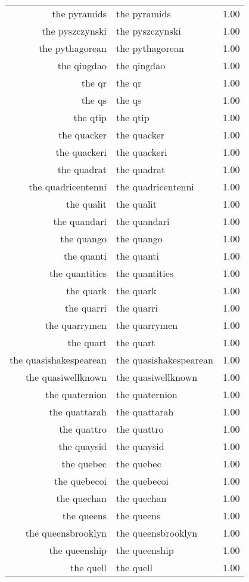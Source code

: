 \begin{table}[ht]
\begin{tabular}{rlr}
  the pyramids & the pyramids & 1.00 \\ 
  the pyszczynski & the pyszczynski & 1.00 \\ 
  the pythagorean & the pythagorean & 1.00 \\ 
  the qingdao & the qingdao & 1.00 \\ 
  the qr & the qr & 1.00 \\ 
  the qs & the qs & 1.00 \\ 
  the qtip & the qtip & 1.00 \\ 
  the quacker & the quacker & 1.00 \\ 
  the quackeri & the quackeri & 1.00 \\ 
  the quadrat & the quadrat & 1.00 \\ 
  the quadricentenni & the quadricentenni & 1.00 \\ 
  the qualit & the qualit & 1.00 \\ 
  the quandari & the quandari & 1.00 \\ 
  the quango & the quango & 1.00 \\ 
  the quanti & the quanti & 1.00 \\ 
  the quantities & the quantities & 1.00 \\ 
  the quark & the quark & 1.00 \\ 
  the quarri & the quarri & 1.00 \\ 
  the quarrymen & the quarrymen & 1.00 \\ 
  the quart & the quart & 1.00 \\ 
  the quasishakespearean & the quasishakespearean & 1.00 \\ 
  the quasiwellknown & the quasiwellknown & 1.00 \\ 
  the quaternion & the quaternion & 1.00 \\ 
  the quattarah & the quattarah & 1.00 \\ 
  the quattro & the quattro & 1.00 \\ 
  the quaysid & the quaysid & 1.00 \\ 
  the quebec & the quebec & 1.00 \\ 
  the quebecoi & the quebecoi & 1.00 \\ 
  the quechan & the quechan & 1.00 \\ 
  the queens & the queens & 1.00 \\ 
  the queensbrooklyn & the queensbrooklyn & 1.00 \\ 
  the queenship & the queenship & 1.00 \\ 
  the quell & the quell & 1.00 \\ 

\end{tabular}
\end{table}
